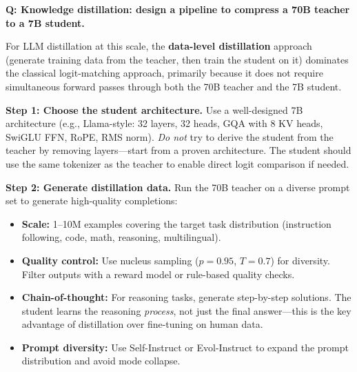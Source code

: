\begin{interviewq}
\textbf{Q: Knowledge distillation: design a pipeline to compress a 70B teacher to a 7B student.}

 \quad {} \quad \badgefreq{\freqmed}

\stronganswer

For LLM distillation at this scale, the \textbf{data-level distillation} approach (generate training data from the teacher, then train the student on it) dominates the classical logit-matching approach, primarily because it does not require simultaneous forward passes through both the 70B teacher and the 7B student.

\textbf{Step 1: Choose the student architecture.}
Use a well-designed 7B architecture (e.g., Llama-style: 32 layers, 32 heads, GQA with 8 KV heads, SwiGLU FFN, RoPE, RMS norm). \textit{Do not} try to derive the student from the teacher by removing layers---start from a proven architecture. The student should use the same tokenizer as the teacher to enable direct logit comparison if needed.

\textbf{Step 2: Generate distillation data.}
Run the 70B teacher on a diverse prompt set to generate high-quality completions:
\begin{itemize}
    \item \textbf{Scale:} 1--10M examples covering the target task distribution (instruction following, code, math, reasoning, multilingual).
    \item \textbf{Quality control:} Use nucleus sampling ($p = 0.95$, $T = 0.7$) for diversity. Filter outputs with a reward model or rule-based quality checks.
    \item \textbf{Chain-of-thought:} For reasoning tasks, generate step-by-step solutions. The student learns the reasoning \textit{process}, not just the final answer---this is the key advantage of distillation over fine-tuning on human data.
    \item \textbf{Prompt diversity:} Use Self-Instruct or Evol-Instruct to expand the prompt distribution and avoid mode collapse.
\end{itemize}


\end{interviewq}
